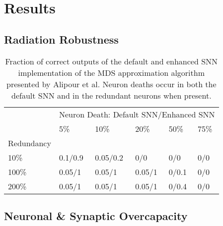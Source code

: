 \section{Results}\label{sec:results}

\subsection{Radiation Robustness}\label{subsec:algorithm_performance}

\begin{table}[H]
\caption{Fraction of correct outputs of the default and enhanced SNN implementation of the MDS approximation algorithm presented by Alipour et al. Neuron deaths occur in both the default SNN and in the redundant neurons when present.}
\begin{tabular}{llllll}
           & \multicolumn{5}{l}{Neuron Death: Default SNN/Enhanced SNN} \\
           & 5\%    & 10\%    & 20\%    & 50\%    & 75\%    \\
Redundancy &        &         &         &         &         \\
10\%       & 0.1/0.9    & 0.05/0.2     & 0/0       & 0/0       & 0/0       \\
100\%      & 0.05/1      & 0.05/1       & 0.05/1       & 0/0.1     & 0/0       \\
200\%      & 0.05/1      & 0.05/1       & 0.05/1       & 0/0.4     & 0/0      
\end{tabular}
\end{table}


\subsection{Neuronal \& Synaptic Overcapacity}\label{subsec:results_neuronal_synaptic_overcapacity}

